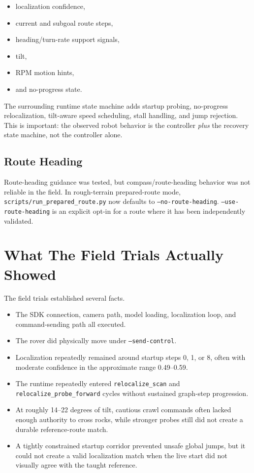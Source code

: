 \documentclass[11pt]{article}
\begin{document}
\begin{itemize}[nosep]
  \item localization confidence,
  \item current and subgoal route steps,
  \item heading/turn-rate support signals,
  \item tilt,
  \item RPM motion hints,
  \item and no-progress state.
\end{itemize}

The surrounding runtime state machine adds startup probing, no-progress
relocalization, tilt-aware speed scheduling, stall handling, and jump rejection.
This is important: the observed robot behavior is the controller \emph{plus}
the recovery state machine, not the controller alone.

\subsection{Route Heading}

Route-heading guidance was tested, but compass/route-heading behavior was not
reliable in the field. In rough-terrain prepared-route mode,
\texttt{scripts/run\_prepared\_route.py} now defaults to
\texttt{--no-route-heading}. \texttt{--use-route-heading} is an explicit
opt-in for a route where it has been independently validated.

\section{What The Field Trials Actually Showed}

The field trials established several facts.

\begin{itemize}[nosep]
  \item The SDK connection, camera path, model loading, localization loop, and
  command-sending path all executed.
  \item The rover did physically move under \texttt{--send-control}.
  \item Localization repeatedly remained around startup steps 0, 1, or 8, often
  with moderate confidence in the approximate range 0.49--0.59.
  \item The runtime repeatedly entered \texttt{relocalize\_scan} and
  \texttt{relocalize\_probe\_forward} cycles without sustained graph-step
  progression.
  \item At roughly 14--22 degrees of tilt, cautious crawl commands often lacked
  enough authority to cross rocks, while stronger probes still did not create a
  durable reference-route match.
  \item A tightly constrained startup corridor prevented unsafe global jumps,
  but it could not create a valid localization match when the live start did not
  visually agree with the taught reference.
\end{itemize}
\end{document}
